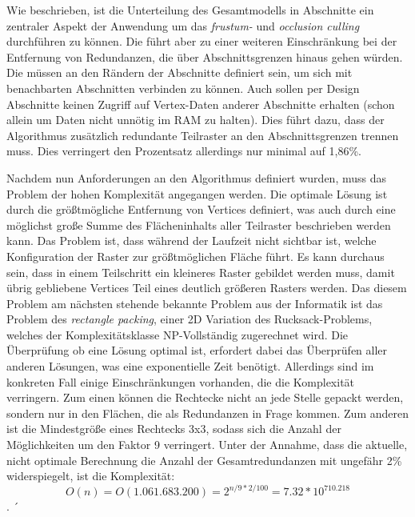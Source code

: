 Wie beschrieben, ist die Unterteilung des Gesamtmodells in Abschnitte ein zentraler Aspekt der Anwendung um das \textit{frustum-} und \textit{occlusion culling} durchführen zu können. Die führt aber zu einer weiteren Einschränkung bei der Entfernung von Redundanzen, die über Abschnittsgrenzen hinaus gehen würden. Die müssen an den Rändern der Abschnitte definiert sein, um sich mit benachbarten Abschnitten verbinden zu können. Auch sollen per Design Abschnitte keinen Zugriff auf Vertex-Daten anderer Abschnitte erhalten (schon allein um Daten nicht unnötig im RAM zu halten). Dies führt dazu, dass der Algorithmus zusätzlich redundante Teilraster an den Abschnittsgrenzen trennen muss. Dies verringert den Prozentsatz allerdings nur minimal auf 1,86\%.

Nachdem nun Anforderungen an den Algorithmus definiert wurden, muss das Problem der hohen Komplexität angegangen werden. Die optimale Lösung ist durch die größtmögliche Entfernung von Vertices definiert, was auch durch eine möglichst große Summe des Flächeninhalts aller Teilraster beschrieben werden kann. Das Problem ist, dass während der Laufzeit nicht sichtbar ist, welche Konfiguration der Raster zur größtmöglichen Fläche führt. Es kann durchaus sein, dass in einem Teilschritt ein kleineres Raster gebildet werden muss, damit übrig gebliebene Vertices Teil eines deutlich größeren Rasters werden. Das diesem Problem am nächsten stehende bekannte Problem aus der Informatik ist das Problem des \textit{rectangle packing}, einer 2D Variation des Rucksack-Problems, welches der Komplexitätsklasse NP-Vollständig zugerechnet wird. Die Überprüfung ob eine Lösung optimal ist, erfordert dabei das Überprüfen aller anderen Lösungen, was eine exponentielle Zeit benötigt. Allerdings sind im konkreten Fall einige Einschränkungen vorhanden, die die Komplexität verringern. Zum einen können die Rechtecke nicht an jede Stelle gepackt werden, sondern nur in den Flächen, die als Redundanzen in Frage kommen. Zum anderen ist die Mindestgröße eines Rechtecks 3x3, sodass sich die Anzahl der Möglichkeiten um den Faktor 9 verringert. Unter der Annahme, dass die aktuelle, nicht optimale Berechnung die Anzahl der Gesamtredundanzen mit ungefähr 2\% widerspiegelt, ist die Komplexität: \[O(n) = O(1.061.683.200) = 2^{n / 9 * 2 / 100} = 7.32 * 10^{710.218}\].
´
